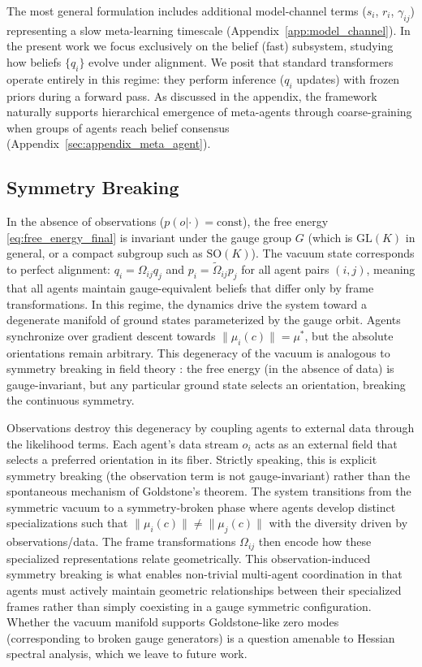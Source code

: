 \documentclass[twoside,11pt]{article}
\begin{document}
The most general formulation includes additional model-channel terms ($s_i$, $r_i$, $\gamma_{ij}$) representing a slow meta-learning timescale (Appendix~\ref{app:model_channel}). In the present work we focus exclusively on the belief (fast) subsystem, studying how beliefs $\{q_i\}$ evolve under alignment. We posit that standard transformers operate entirely in this regime: they perform inference ($q_i$ updates) with frozen priors during a forward pass. As discussed in the appendix, the framework naturally supports hierarchical emergence of meta-agents through coarse-graining when groups of agents reach belief consensus (Appendix~\ref{sec:appendix_meta_agent}).

\subsection{Symmetry Breaking}
\label{sec:symmetry_breaking}
In the absence of observations ($p(o|\cdot) = \text{const}$), the free energy \eqref{eq:free_energy_final} is invariant under the gauge group $G$ (which is $\mathrm{GL}(K)$ in general, or a compact subgroup such as $\mathrm{SO}(K)$). The vacuum state corresponds to perfect alignment: $q_i = \Omega_{ij}q_j$ and $p_i = \tilde{\Omega}_{ij}p_j$ for all agent pairs $(i,j)$, meaning that all agents maintain gauge-equivalent beliefs that differ only by frame transformations. In this regime, the dynamics drive the system toward a degenerate manifold of ground states parameterized by the gauge orbit. Agents synchronize over gradient descent towards $\|\mu_i(c)\| = \mu^*$, but the absolute orientations remain arbitrary. This degeneracy of the vacuum is analogous to symmetry breaking in field theory \citep{weinberg1995quantum,goldstone1962field}: the free energy (in the absence of data) is gauge-invariant, but any particular ground state selects an orientation, breaking the continuous symmetry.

Observations destroy this degeneracy by coupling agents to external data through the likelihood terms. Each agent's data stream $o_i$ acts as an external field that selects a preferred orientation in its fiber. Strictly speaking, this is explicit symmetry breaking (the observation term is not gauge-invariant) rather than the spontaneous mechanism of Goldstone's theorem. The system transitions from the symmetric vacuum to a symmetry-broken phase where agents develop distinct specializations such that $\|\mu_i(c)\| \neq \|\mu_j(c)\|$ with the diversity driven by observations/data. The frame transformations $\Omega_{ij}$ then encode how these specialized representations relate geometrically. This observation-induced symmetry breaking is what enables non-trivial multi-agent coordination in that agents must actively maintain geometric relationships between their specialized frames rather than simply coexisting in a gauge symmetric configuration. Whether the vacuum manifold supports Goldstone-like zero modes (corresponding to broken gauge generators) is a question amenable to Hessian spectral analysis, which we leave to future work.
\end{document}
